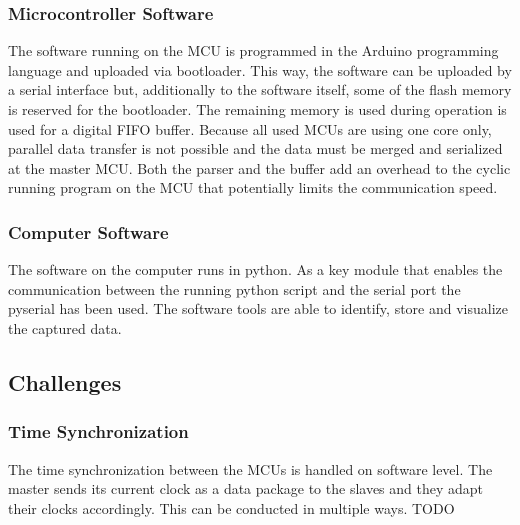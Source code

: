 \subsubsection{Microcontroller Software}
The software running on the \ac{MCU} is programmed in the Arduino programming language and uploaded via bootloader. This way, the software can be uploaded by a serial interface but, additionally to the software itself, some of the flash memory is reserved for the bootloader. The remaining memory is used during operation is used for a digital \ac{FIFO} buffer.
Because all used \ac{MCU}s are using one core only, parallel data transfer is not possible and the data must be merged and serialized at the master \ac{MCU}. Both the parser and the buffer add an overhead to the cyclic running program on the \ac{MCU} that potentially limits the communication speed.

\subsubsection{Computer Software}
The software on the computer runs in python. As a key module that enables the communication between the running python script and the serial port the pyserial has been used. The software tools are able to identify, store and visualize the captured data.

\subsection{Challenges}

\subsubsection{Time Synchronization}

The time synchronization between the \ac{MCU}s is handled on software level. The master sends its current clock as a data package to the slaves and they adapt their clocks accordingly. This can be conducted in multiple ways. TODO
